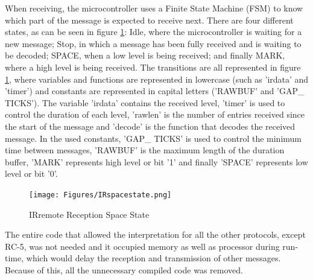 When receiving, the microcontroller uses a Finite State Machine (FSM) to know which part of the message is expected to receive next. There are four different states, as can be seen in figure \ref{fig:IRspacestate}: Idle, where the microcontroller is waiting for a new message; Stop, in which a message has been fully received and is waiting to be decoded; SPACE, when a low level is being received; and finally MARK, where a high level is being received. The transitions are all represented in figure \ref{fig:IRspacestate}, where variables and functions are represented in lowercase (such as 'irdata' and 'timer') and constants are represented in capital letters ('RAWBUF' and 'GAP\_ TICKS'). The variable 'irdata' contains the received level, 'timer' is used to control the duration of each level, 'rawlen' is the number of entries received since the start of the message and 'decode' is the function that decodes the received message. In the used constants, 'GAP\_ TICKS' is used to control the minimum time between messages, 'RAWBUF' is the maximum length of the duration buffer, 'MARK' represents high level or bit '1' and finally 'SPACE' represents low level or bit '0'.\\
\begin{figure}[!htb]
  \centering
  \texttt{[image: Figures/IRspacestate.png]}
  \caption[IRremote Reception Space State]{IRremote Reception Space State}
  \label{fig:IRspacestate}
\end{figure}

The entire code that allowed the interpretation for all the other protocols, except RC-5, was not needed and it occupied memory as well as processor during run-time, which would delay the reception and transmission of other messages. Because of this, all the unnecessary compiled code was removed.\\

